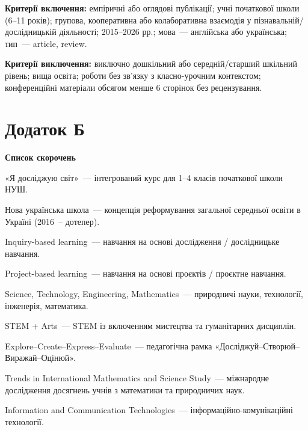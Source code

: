 \documentclass[a4paper,14pt]{extarticle}
\begin{document}
\textbf{Критерії включення:} емпіричні або оглядові публікації; учні початкової школи (6--11 років); групова, кооперативна або колаборативна взаємодія у пізнавальній/дослідницькій діяльності; 2015--2026 рр.; мова~--- англійська або українська; тип~--- article, review.

\textbf{Критерії виключення:} виключно дошкільний або середній/старший шкільний рівень; вища освіта; роботи без зв'язку з класно-урочним контекстом; конференційні матеріали обсягом менше 6 сторінок без рецензування.

\newpage

\section*{Додаток Б}

\begin{center}
\textbf{Список скорочень}
\end{center}

\begin{description}[leftmargin=3cm, style=nextline]
  \item[ЯДС] «Я досліджую світ»~--- інтегрований курс для 1--4 класів початкової школи НУШ.
  \item[НУШ] Нова українська школа~--- концепція реформування загальної середньої освіти в Україні (2016~-- дотепер).
  \item[IBL] Inquiry-based learning~--- навчання на основі дослідження / дослідницьке навчання.
  \item[PjBL] Project-based learning~--- навчання на основі проєктів / проєктне навчання.
  \item[STEM] Science, Technology, Engineering, Mathematics~--- природничі науки, технології, інженерія, математика.
  \item[STEAM] STEM + Arts~--- STEM із включенням мистецтва та гуманітарних дисциплін.
  \item[ECEE] Explore–Create–Express–Evaluate~--- педагогічна рамка «Досліджуй–Створюй–Виражай–Оцінюй».
  \item[TIMSS] Trends in International Mathematics and Science Study~--- міжнародне дослідження досягнень учнів з математики та природничих наук.
  \item[ICT] Information and Communication Technologies~--- інформаційно-комунікаційні технології.
\end{description}
\end{document}
